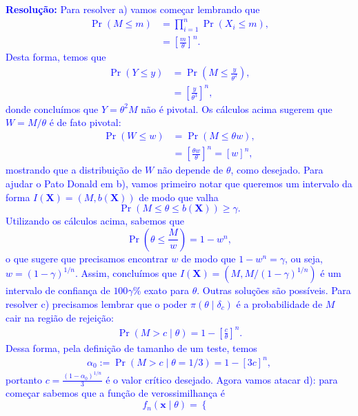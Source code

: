 \documentclass[a4paper,10pt, notitlepage]{report}
\newcommand{\pr}{\operatorname{Pr}} %
\newcommand{\bX}{\boldsymbol{X}} %
\newcommand{\bx}{\boldsymbol{x}} %
\begin{document}
\textcolor{blue}{
\textbf{Resolução:}
Para resolver a) vamos começar lembrando que
\begin{align*}
 \pr\left( M \leq m \right) &= \prod_{i=1}^n \pr(X_i \leq m),\\
 &= \left[\frac{m}{\theta}\right]^n.
\end{align*}
Desta forma, temos que 
\begin{align*}
 \pr\left( Y \leq y \right) &= \pr\left( M \leq \frac{y}{\theta^2} \right),\\
 &= \left[\frac{y}{\theta^3}\right]^n,
\end{align*}
donde concluímos que $Y = \theta^2 M$ não é pivotal.
Os cálculos acima sugerem que $W = M/\theta$ é de fato pivotal:
\begin{align*}
 \pr\left( W\leq w \right) &= \pr\left( M \leq \theta w \right),\\
 &= \left[\frac{\theta w}{\theta}\right]^n = \left[w\right]^n,
\end{align*}
mostrando que a distribuição de $W$ não depende de $\theta$, como desejado.
Para ajudar o Pato Donald em b), vamos primeiro notar que queremos um intervalo da forma $I(\bX) = (M, b(\bX))$ de modo que valha
\begin{equation*}
 \pr( M \leq \theta \leq b(\bX)) \geq \gamma.
\end{equation*}
Utilizando os cálculos acima, sabemos que
\begin{equation*}
 \pr\left(\theta \leq \frac{M}{w}\right) = 1 - w^n,
\end{equation*}
o que sugere que precisamos encontrar $w$ de modo que $1-w^n = \gamma$, ou seja, $w = (1-\gamma)^{1/n}$.
Assim, concluímos que $I(\bX) = (M, M/(1-\gamma)^{1/n})$ é um intervalo de confiança de $100\gamma \%$ exato para $\theta$.
Outras soluções são possíveis.
Para resolver c) precisamos lembrar que o poder $\pi(\theta \mid \delta_c)$ é a probabilidade de $M$ cair na região de rejeição:
\begin{align*}
 \pr(M > c \mid \theta) = 1 - \left[\frac{c}{\theta}\right]^n.
\end{align*}
Dessa forma, pela definição de tamanho de um teste, temos
\begin{align*}
 \alpha_0 := \pr(M > c \mid \theta = 1/3) = 1 - \left[3c\right]^n,
\end{align*}
portanto $c = \frac{(1-\alpha_0)^{1/n}}{3}$ é o valor crítico desejado.
Agora vamos atacar d): para começar sabemos que a função de verossimilhança é 
\begin{equation*}
 f_n(\bx \mid \theta) = \begin{cases}

\end{cases}
\end{equation*}}
\end{document}
